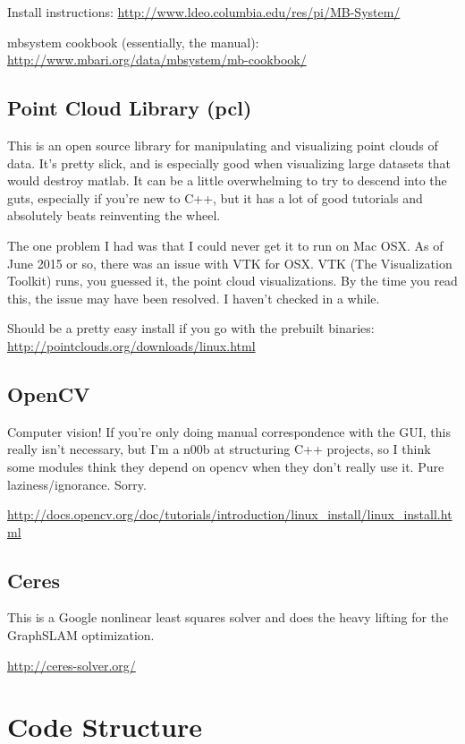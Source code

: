 \documentclass[12pt]{amsart}
\begin{document}
Install instructions: \url{http://www.ldeo.columbia.edu/res/pi/MB-System/}

mbsystem cookbook (essentially, the manual): \url{http://www.mbari.org/data/mbsystem/mb-cookbook/}

\subsection*{Point Cloud Library (pcl)}
This is an open source library for manipulating and visualizing point clouds of data. It's pretty slick, and is especially good when visualizing large datasets that would destroy matlab. It can be a little overwhelming to try to descend into the guts, especially if you're new to C++, but it has a lot of good tutorials and absolutely beats reinventing the wheel.

The one problem I had was that I could never get it to run on Mac OSX. As of June 2015 or so, there was an issue with VTK for OSX. VTK (The Visualization Toolkit) runs, you guessed it, the point cloud visualizations. By the time you read this, the issue may have been resolved. I haven't checked in a while.

Should be a pretty easy install if you go with the prebuilt binaries: 
\url{http://pointclouds.org/downloads/linux.html}

\subsection*{OpenCV}
Computer vision! If you're only doing manual correspondence with the GUI, this really isn't necessary, but I'm a n00b at structuring C++ projects, so I think some modules think they depend on opencv when they don't really use it. Pure laziness/ignorance. Sorry.

\url{http://docs.opencv.org/doc/tutorials/introduction/linux_install/linux_install.html}

\subsection*{Ceres}
This is a Google nonlinear least squares solver and does the heavy lifting for the GraphSLAM optimization.

\url{http://ceres-solver.org/}

\section{Code Structure}
\end{document}
